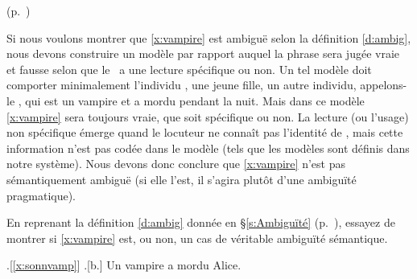 \begin{exo}\label{exo:speci}
%
\begin{solu}(p.~\pageref{exo:speci})\label{crg:speci}

Si nous voulons montrer que \ref{x:vampire} est ambiguë selon la définition \ref{d:ambig}, nous devons construire un modèle par rapport auquel la phrase sera jugée vraie et fausse selon que le \GN\ a une lecture spécifique ou non.
Un tel modèle doit comporter minimalement l'individu , une jeune fille,  un autre individu, appelons-le , qui est un vampire et  a mordu  pendant la nuit.  Mais dans ce modèle \ref{x:vampire} sera toujours vraie, que  soit spécifique ou non.  La lecture (ou l'usage) non spécifique émerge quand le locuteur ne connaît pas l'identité de , mais cette information n'est pas codée dans le modèle (tels que les modèles sont définis dans notre système).  Nous devons donc conclure que \ref{x:vampire} n'est pas sémantiquement ambiguë (si elle l'est, il s'agira plutôt d'une ambiguïté pragmatique).
\end{solu}
En reprenant la définition \ref{d:ambig} 
%
donnée en \S\ref{s:Ambiguïté}
(p.~\pageref{d:ambig}), essayez de montrer si \ref{x:vampire} est, ou
non, un cas de véritable ambiguïté sémantique.

\ex.[\ref{x:sonnvamp}]
\a.[b.] Un vampire a mordu Alice.

\end{exo}
